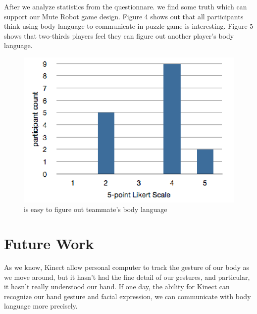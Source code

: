 \documentclass{chi-ext}
\begin{document}
After we analyze statistics from the questionnare. we find some truth which can support our Mute Robot game design. 
Figure 4 shows out that all participants think using body language to communicate in puzzle game is interesting.
Figure 5 shows that two-thirds players feel they can figure out another player's body language.


\begin{figure}
  \centering
  \includegraphics[width=0.9\linewidth]{figures/2_BLunderstand.png}
  \caption{is easy to figure out teammate's body language}
  \label{fig:2_BLunderstand}
\end{figure}






\section{Future Work}

As we know, Kinect allow personal computer to track the gesture of our body as we move around, but it hasn't had the fine detail of our gestures, and particular, it hasn't really understood our hand. If one day, the ability for Kinect can recognize our hand gesture and facial expression, we can communicate with body language more precisely. 
\end{document}
